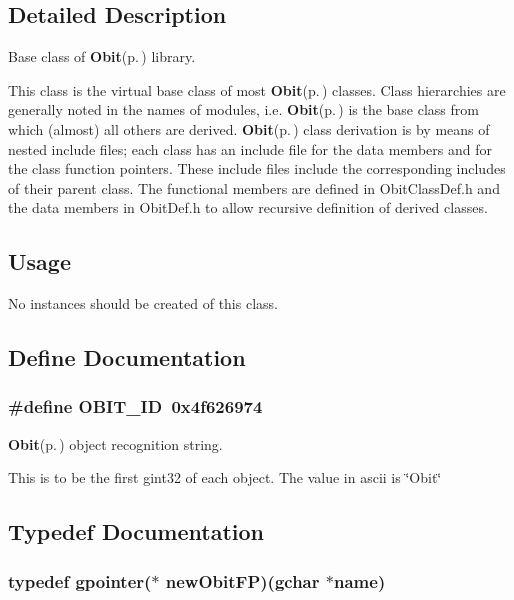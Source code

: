 \subsection{Detailed Description}
Base class of {\bf Obit}{\rm (p.\,\pageref{structObit})} library. 

This class is the virtual base class of most {\bf Obit}{\rm (p.\,\pageref{structObit})} classes. Class hierarchies are generally noted in the names of modules, i.e. {\bf Obit}{\rm (p.\,\pageref{structObit})} is the base class from which (almost) all others are derived. {\bf Obit}{\rm (p.\,\pageref{structObit})} class derivation is by means of nested include files; each class has an include file for the data members and for the class function pointers. These include files include the corresponding includes of their parent class. The functional members are defined in Obit\-Class\-Def.h and the data members in Obit\-Def.h to allow recursive definition of derived classes.\subsection{Usage}\label{Obit_8h_ObitUsage}
No instances should be created of this class.

\subsection{Define Documentation}
\subsubsection{\setlength{\rightskip}{0pt plus 5cm}\#define OBIT\_\-ID\ 0x4f626974}\label{Obit_8h_a0}


{\bf Obit}{\rm (p.\,\pageref{structObit})} object recognition string. 

This is to be the first gint32 of each object. The value in ascii is \char`\"{}Obit\char`\"{} 

\subsection{Typedef Documentation}
\subsubsection{\setlength{\rightskip}{0pt plus 5cm}typedef gpointer($\ast$ {\bf new\-Obit\-FP})(gchar $\ast$name)}\label{Obit_8h_a1}


